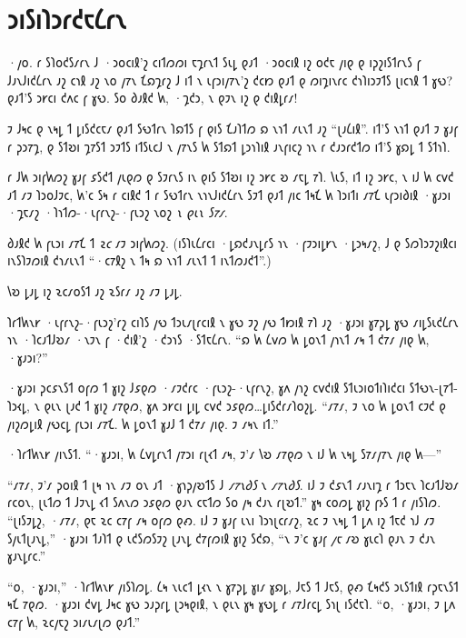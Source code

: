 \chapter{𐑮𐑦𐑕𐑦𐑐𐑮𐑩𐑒𐑱𐑖𐑩𐑯}

\begin{chapterOpeningAuthorNote}
·𐑢𐑴. 𐑩 𐑕𐑐𐑴𐑒𐑕𐑥𐑩𐑯 𐑓 ·𐑮𐑴𐑤𐑦𐑙'𐑟 𐑤𐑦𐑑𐑼𐑼𐑦 𐑱𐑡𐑩𐑯𐑑 𐑕𐑧𐑛 𐑞𐑨𐑑 ·𐑮𐑴𐑤𐑦𐑙 𐑦𐑟 𐑴𐑒𐑱 𐑢𐑦𐑞 𐑞 𐑦𐑜𐑟𐑦𐑕𐑑𐑩𐑯𐑕 𐑝 𐑓𐑨𐑯𐑓𐑦𐑒𐑖𐑩𐑯 𐑨𐑟 𐑤𐑪𐑙 𐑨𐑟 𐑯𐑴 𐑢𐑳𐑯 𐑗𐑸𐑡𐑩𐑟 𐑓 𐑦𐑑 𐑯 𐑧𐑝𐑮𐑦𐑢𐑳𐑯'𐑟 𐑒𐑤𐑽 𐑞𐑨𐑑 𐑞 𐑼𐑦𐑡𐑦𐑯𐑩𐑤 𐑒𐑪𐑐𐑦𐑮𐑲𐑑𐑕 𐑚𐑦𐑤𐑪𐑙 𐑑 𐑣𐑻? 𐑞𐑨𐑑'𐑕 𐑮𐑾𐑤𐑦 𐑒𐑵𐑤 𐑝 𐑣𐑻. 𐑕𐑴 𐑔𐑨𐑙𐑒 𐑿, ·𐑡𐑒𐑮, 𐑯 𐑞𐑲𐑯 𐑦𐑟 𐑞 𐑒𐑦𐑙𐑛𐑩𐑥!

𐑲 𐑓𐑰𐑤 𐑞 𐑯𐑰𐑛 𐑑 𐑛𐑦𐑕𐑒𐑤𐑱𐑥 𐑞𐑨𐑑 𐑕𐑻𐑑𐑩𐑯 𐑐𐑸𐑑𐑕 𐑝 𐑞𐑦𐑕 𐑗𐑨𐑐𐑑𐑼 𐑸 𐑯𐑪𐑑 𐑥𐑧𐑯𐑑 𐑨𐑟 “𐑚𐑨𐑖𐑦𐑙”. 𐑦𐑑'𐑕 𐑯𐑪𐑑 𐑞𐑨𐑑 𐑲 𐑣𐑨𐑝 𐑩 𐑜𐑮𐑳𐑡, 𐑞 𐑕𐑑𐑹𐑦 𐑡𐑳𐑕𐑑 𐑮𐑲𐑑𐑕 𐑦𐑑𐑕𐑧𐑤𐑓 𐑯 𐑢𐑳𐑯𐑕 𐑿 𐑕𐑑𐑸𐑑 𐑛𐑮𐑪𐑐𐑦𐑙 𐑨𐑯𐑝𐑦𐑤𐑟 𐑪𐑯 𐑩 𐑒𐑨𐑮𐑩𐑒𐑑𐑼 𐑦𐑑'𐑕 𐑣𐑸𐑛 𐑑 𐑕𐑑𐑪𐑐.

𐑩 𐑓𐑿 𐑮𐑦𐑝𐑿𐑼𐑟 𐑣𐑨𐑝 𐑭𐑕𐑒𐑑 𐑢𐑧𐑞𐑼 𐑞 𐑕𐑲𐑩𐑯𐑕 𐑦𐑯 𐑞𐑦𐑕 𐑕𐑑𐑹𐑦 𐑦𐑟 𐑮𐑾𐑤 𐑹 𐑥𐑱𐑛 𐑳𐑐. 𐑘𐑧𐑕, 𐑦𐑑 𐑦𐑟 𐑮𐑾𐑤, 𐑯 𐑦𐑓 𐑿 𐑤𐑫𐑒 𐑨𐑑 𐑥𐑲 𐑐𐑮𐑴𐑓𐑲𐑤, 𐑿'𐑤 𐑕𐑰 𐑩 𐑤𐑦𐑙𐑒 𐑑 𐑩 𐑕𐑻𐑑𐑩𐑯 𐑯𐑪𐑯𐑓𐑦𐑒𐑖𐑩𐑯 𐑕𐑲𐑑 𐑞𐑨𐑑 𐑢𐑦𐑤 𐑑𐑰𐑗 𐑿 𐑐𐑮𐑦𐑑𐑦 𐑥𐑳𐑗 𐑧𐑝𐑮𐑦𐑔𐑦𐑙 ·𐑣𐑨𐑮𐑦 ·𐑡𐑱𐑥𐑟 ·𐑐𐑪𐑑𐑼-·𐑧𐑝𐑩𐑯𐑟-·𐑝𐑧𐑮𐑟 𐑯𐑴𐑟 \emph{𐑯 𐑞𐑧𐑯 𐑕𐑳𐑥}.

𐑔𐑨𐑙𐑒 𐑿 𐑝𐑧𐑮𐑦 𐑥𐑳𐑗 𐑑 \emph{𐑷𐑤} 𐑥𐑲 𐑮𐑦𐑝𐑿𐑼𐑟. (𐑦𐑕𐑐𐑧𐑖𐑩𐑤𐑦 ·𐑛𐑸𐑒𐑨𐑯𐑛𐑩𐑕 𐑪𐑯 ·𐑝𐑲𐑮𐑦𐑛𐑾𐑯 ·𐑛𐑮𐑰𐑥𐑟, 𐑓 𐑞 𐑕𐑼𐑐𐑮𐑲𐑟𐑦𐑙𐑤𐑦 𐑦𐑯𐑕𐑐𐑲𐑼𐑦𐑙 𐑒𐑪𐑥𐑧𐑯𐑑 “·𐑤𐑳𐑙𐑟 𐑯 𐑑𐑰 𐑸 𐑯𐑪𐑑 𐑥𐑧𐑯𐑑 𐑑 𐑦𐑯𐑑𐑼𐑨𐑒𐑑”.)
\end{chapterOpeningAuthorNote}
\begin{chapterOpeningQuote}
𐑘𐑹 𐑛𐑨𐑛 𐑦𐑟 𐑷𐑤𐑥𐑴𐑕𐑑 𐑨𐑟 𐑷𐑕𐑩𐑥 𐑨𐑟 𐑥𐑲 𐑛𐑨𐑛.
\end{chapterOpeningQuote}

\lettrine{𐑐}{𐑩𐑑𐑿𐑯𐑾} ·𐑧𐑝𐑩𐑯𐑟-·𐑝𐑧𐑮𐑟'𐑩𐑟 𐑤𐑦𐑐𐑕 𐑢𐑻 𐑑𐑮𐑧𐑥𐑚𐑩𐑤𐑦𐑙 𐑯 𐑣𐑻 𐑲𐑟 𐑢𐑻 𐑑𐑽𐑦𐑙 𐑳𐑐 𐑨𐑟 ·𐑣𐑨𐑮𐑦 𐑣𐑳𐑜𐑛 𐑣𐑻 𐑥𐑦𐑛𐑕𐑧𐑒𐑖𐑩𐑯 𐑪𐑯 ·𐑐𐑤𐑨𐑑𐑓𐑹𐑥 ·𐑯𐑲𐑯 𐑝 ·𐑒𐑦𐑙'𐑟 ·𐑒𐑮𐑪𐑕 ·𐑕𐑑𐑱𐑖𐑩𐑯. “𐑸 𐑿 𐑖𐑫𐑼 𐑿 𐑛𐑴𐑯𐑑 𐑢𐑪𐑯𐑑 𐑥𐑰 𐑑 𐑒𐑳𐑥 𐑢𐑦𐑞 𐑿, ·𐑣𐑨𐑮𐑦?”

·𐑣𐑨𐑮𐑦 𐑜𐑤𐑭𐑯𐑕𐑑 𐑴𐑝𐑼 𐑑 𐑣𐑦𐑟 𐑓𐑭𐑞𐑼 ·𐑥𐑲𐑒𐑩𐑤 ·𐑝𐑧𐑮𐑟-·𐑧𐑝𐑩𐑯𐑟, 𐑣𐑵 𐑢𐑪𐑟 𐑤𐑫𐑒𐑦𐑙 𐑕𐑑𐑧𐑮𐑦𐑴𐑑𐑦𐑐𐑦𐑒𐑤𐑦 𐑕𐑑𐑻𐑯-𐑚𐑳𐑑-𐑐𐑮𐑬𐑛, 𐑯 𐑞𐑧𐑯 𐑚𐑨𐑒 𐑑 𐑣𐑦𐑟 𐑥𐑳𐑞𐑼, 𐑣𐑵 𐑮𐑾𐑤𐑦 𐑛𐑦𐑛 𐑤𐑫𐑒 𐑮𐑭𐑞𐑼…𐑛𐑦𐑕𐑒𐑩𐑥𐑐𐑴𐑟𐑛. “𐑥𐑳𐑥, 𐑲 𐑯𐑴 𐑿 𐑛𐑴𐑯𐑑 𐑤𐑲𐑒 𐑞 𐑢𐑦𐑟𐑼𐑛𐑦𐑙 𐑢𐑻𐑤𐑛 𐑝𐑧𐑮𐑦 𐑥𐑳𐑗. 𐑿 𐑛𐑴𐑯𐑑 𐑣𐑨𐑓 𐑑 𐑒𐑳𐑥 𐑢𐑦𐑞. 𐑲 𐑥𐑰𐑯 𐑦𐑑.”

·𐑐𐑩𐑑𐑿𐑯𐑾 𐑢𐑦𐑯𐑕𐑑. “·𐑣𐑨𐑮𐑦, 𐑿 𐑖𐑫𐑛𐑩𐑯𐑑 𐑢𐑳𐑮𐑦 𐑩𐑚𐑬𐑑 𐑥𐑰, 𐑲'𐑥 𐑘𐑹 𐑥𐑳𐑞𐑼 𐑯 𐑦𐑓 𐑿 𐑯𐑰𐑛 𐑕𐑳𐑥𐑢𐑳𐑯 𐑢𐑦𐑞 𐑿—”

“𐑥𐑳𐑥, 𐑲'𐑥 𐑜𐑴𐑦𐑙 𐑑 𐑚𐑰 𐑪𐑯 𐑥𐑲 𐑴𐑯 𐑨𐑑 ·𐑣𐑪𐑜𐑢𐑹𐑑𐑕 𐑓 \emph{𐑥𐑳𐑯𐑔𐑕} 𐑯 \emph{𐑥𐑳𐑯𐑔𐑕}. 𐑦𐑓 𐑲 𐑒𐑭𐑯𐑑 𐑥𐑨𐑯𐑦𐑡 𐑩 𐑑𐑮𐑱𐑯 𐑐𐑤𐑨𐑑𐑓𐑹𐑥 𐑩𐑤𐑴𐑯, 𐑚𐑧𐑑𐑼 𐑑 𐑓𐑲𐑯𐑛 𐑬𐑑 𐑕𐑵𐑯𐑼 𐑮𐑭𐑞𐑼 𐑞𐑨𐑯 𐑤𐑱𐑑𐑼 𐑕𐑴 𐑢𐑰 𐑒𐑨𐑯 𐑩𐑚𐑹𐑑.” 𐑣𐑰 𐑤𐑴𐑼𐑛 𐑣𐑦𐑟 𐑝𐑶𐑕 𐑑 𐑩 𐑢𐑦𐑕𐑐𐑼. “𐑚𐑦𐑕𐑲𐑛𐑟, ·𐑥𐑳𐑥, 𐑞𐑱 𐑷𐑤 𐑤𐑳𐑝 𐑥𐑰 𐑴𐑝𐑼 𐑞𐑺. 𐑦𐑓 𐑲 𐑣𐑨𐑝 𐑧𐑯𐑦 𐑐𐑮𐑪𐑚𐑤𐑩𐑥𐑟, 𐑷𐑤 𐑲 𐑯𐑰𐑛 𐑑 𐑛𐑵 𐑦𐑟 𐑑𐑱𐑒 𐑪𐑓 𐑥𐑲 𐑕𐑢𐑧𐑑𐑚𐑨𐑯𐑛,” ·𐑣𐑨𐑮𐑦 𐑑𐑨𐑐𐑑 𐑞 𐑧𐑒𐑕𐑼𐑕𐑲𐑟 𐑚𐑨𐑯𐑛 𐑒𐑳𐑝𐑼𐑦𐑙 𐑣𐑦𐑟 𐑕𐑒𐑸, “𐑯 𐑲'𐑤 𐑣𐑨𐑝 \emph{𐑢𐑱} 𐑥𐑹 𐑣𐑧𐑤𐑐 𐑞𐑨𐑯 𐑲 𐑒𐑨𐑯 𐑣𐑨𐑯𐑛𐑩𐑤.”

“𐑴, ·𐑣𐑨𐑮𐑦,” ·𐑐𐑩𐑑𐑿𐑯𐑾 𐑢𐑦𐑕𐑐𐑼𐑛. 𐑖𐑰 𐑯𐑧𐑤𐑑 𐑛𐑬𐑯 𐑯 𐑣𐑳𐑜𐑛 𐑣𐑦𐑥 𐑣𐑸𐑛, 𐑓𐑱𐑕 𐑑 𐑓𐑱𐑕, 𐑞𐑺 𐑗𐑰𐑒𐑕 𐑮𐑧𐑕𐑑𐑦𐑙 𐑩𐑜𐑱𐑯𐑕𐑑 𐑰𐑗 𐑳𐑞𐑼. ·𐑣𐑨𐑮𐑦 𐑒𐑫𐑛 𐑓𐑰𐑤 𐑣𐑻 𐑮𐑨𐑜𐑩𐑛 𐑚𐑮𐑰𐑞𐑦𐑙, 𐑯 𐑞𐑧𐑯 𐑣𐑰 𐑣𐑻𐑛 𐑩 𐑥𐑳𐑓𐑩𐑤𐑛 𐑕𐑪𐑚 𐑦𐑕𐑒𐑱𐑐. “𐑴, ·𐑣𐑨𐑮𐑦, 𐑲 𐑛𐑵 𐑤𐑳𐑝 𐑿, 𐑷𐑤𐑢𐑱𐑟 𐑮𐑦𐑥𐑧𐑥𐑚𐑼 𐑞𐑨𐑑.”

